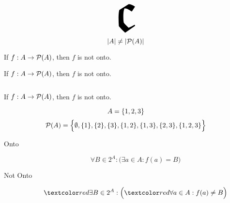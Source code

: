 
\begin{frame}{}
  \begin{center}
  \end{center}

  \[
    \scalebox{8.5}{$\mathfrak{c}$}
  \]
\end{frame}

\begin{frame}{}
  \begin{theorem}
    \[
      |A| \neq |\mathcal{P}(A)|
    \]
  \end{theorem}

  \pause
  \begin{theorem}
    If $f: A \to \mathcal{P}(A)$, then $f$ is not onto.
  \end{theorem}

  \pause
  \vspace{0.60cm}
\end{frame}

\begin{frame}{}
  \begin{theorem}
    If $f: A \to \mathcal{P}(A)$, then $f$ is not onto.
  \end{theorem}

  \vspace{0.60cm}
  \begin{columns}
    \pause
    \pause
    \pause
  \end{columns}
\end{frame}

\begin{frame}{}
  \begin{theorem}
    If $f: A \to \mathcal{P}(A)$, then $f$ is not onto.
  \end{theorem}

  \vspace{0.30cm}
  \[
    A = \{1,2,3\}
  \]
  \pause
  \[
    \mathcal{P}(A) = \Big\{\emptyset, \{1\}, \{2\}, \{3\}, \{1,2\}, \{1,3\}, \{2,3\}, \{1,2,3\}\Big\}
  \]

  \pause
  \begin{description}
    \item[Onto]
      \[
	\forall B \in 2^{A}: \Big(\exists a \in A: f(a) = B\Big)
      \]
    \pause
    \item[Not Onto]
      \[
	\red{\exists} B \in 2^{A}: \Big(\red{\forall} a \in A: f(a) \neq B\Big)
      \]
  \end{description}
\end{frame}

